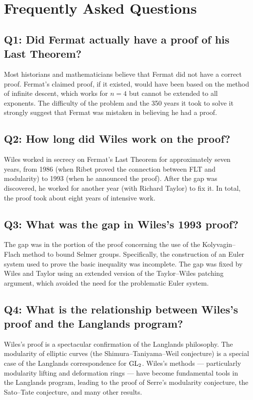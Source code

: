 \section{Frequently Asked Questions}

\subsection*{Q1: Did Fermat actually have a proof of his Last Theorem?}

Most historians and mathematicians believe that Fermat did not have a correct proof. Fermat's claimed proof, if it existed, would have been based on the method of infinite descent, which works for \(n = 4\) but cannot be extended to all exponents. The difficulty of the problem and the 350 years it took to solve it strongly suggest that Fermat was mistaken in believing he had a proof.

\subsection*{Q2: How long did Wiles work on the proof?}

Wiles worked in secrecy on Fermat's Last Theorem for approximately seven years, from 1986 (when Ribet proved the connection between FLT and modularity) to 1993 (when he announced the proof). After the gap was discovered, he worked for another year (with Richard Taylor) to fix it. In total, the proof took about eight years of intensive work.

\subsection*{Q3: What was the gap in Wiles's 1993 proof?}

The gap was in the portion of the proof concerning the use of the Kolyvagin--Flach method to bound Selmer groups. Specifically, the construction of an Euler system used to prove the basic inequality was incomplete. The gap was fixed by Wiles and Taylor using an extended version of the Taylor--Wiles patching argument, which avoided the need for the problematic Euler system.

\subsection*{Q4: What is the relationship between Wiles's proof and the Langlands program?}

Wiles's proof is a spectacular confirmation of the Langlands philosophy. The modularity of elliptic curves (the Shimura--Taniyama--Weil conjecture) is a special case of the Langlands correspondence for \(\operatorname{GL}_2\). Wiles's methods --- particularly modularity lifting and deformation rings --- have become fundamental tools in the Langlands program, leading to the proof of Serre's modularity conjecture, the Sato--Tate conjecture, and many other results.


